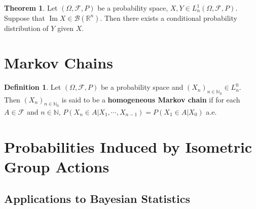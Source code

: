 \documentclass[12pt]{amsart}
\theoremstyle{definition}
\newtheorem{defn}[definition]{Definition}
\newtheorem{thm}[definition]{Theorem}
\newcommand{\Om}{\Omega}
\newcommand{\N}{\mathbb{N}}
\newcommand{\R}{\mathbb{R}}
\newcommand{\MB}{\mathcal{B}}
\newcommand{\MF}{\mathcal{F}}
\DeclareMathOperator{\Img}{Im}
\begin{document}
	\begin{thm}
	Let $(\Om, \MF, P)$ be a probability space, $X,Y \in L_n^1(\Om, \MF, P)$. Suppose that $\Img X \in \MB(\R^n)$. Then there exists a conditional probability distribution of $Y$ given $X$. 
	\end{thm}
	
	
	
	
	
	
	
	
	
	
	
	
	
	
	\newpage
	\section{Markov Chains}	

	
	\begin{defn}
	Let $(\Om, \MF, P)$ be a probability space and $(X_n)_{n \in \N_0} \in L_n^0$. Then $(X_n)_{n \in \N_0}$ is said to be a \textbf{homogeneous Markov chain} if for each $A \in \MF$ and $n \in \N$, $P(X_n \in A| X_1, \cdots, X_{n-1}) = P(X_1 \in A| X_{0})$ a.e. 
	\end{defn}
	
	
	
	
	
	
	
	
	
	
	
	
	
	
	
	
	
	
	
	
	
	
	
	\newpage
	\section{Probabilities Induced by Isometric Group Actions}
	
	\subsection{Applications to Bayesian Statistics}
	
\end{document}
